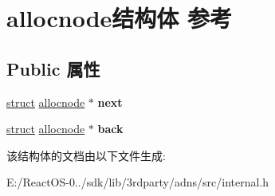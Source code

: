 \hypertarget{structallocnode}{}\section{allocnode结构体 参考}
\label{structallocnode}
\subsection*{Public 属性}
\begin{DoxyCompactItemize}
\item 
\mbox{\label{structallocnode_a21707d8341a939c1e6bce8608e152944}} 
\hyperlink{interfacestruct}{struct} \hyperlink{structallocnode}{allocnode} $\ast$ {\bfseries next}
\item 
\mbox{\label{structallocnode_a54649b46ea419e15eebb9dc1b9a9829c}} 
\hyperlink{interfacestruct}{struct} \hyperlink{structallocnode}{allocnode} $\ast$ {\bfseries back}
\end{DoxyCompactItemize}


该结构体的文档由以下文件生成\+:\begin{DoxyCompactItemize}
\item 
E\+:/\+React\+O\+S-\/0../sdk/lib/3rdparty/adns/src/internal.\+h\end{DoxyCompactItemize}
